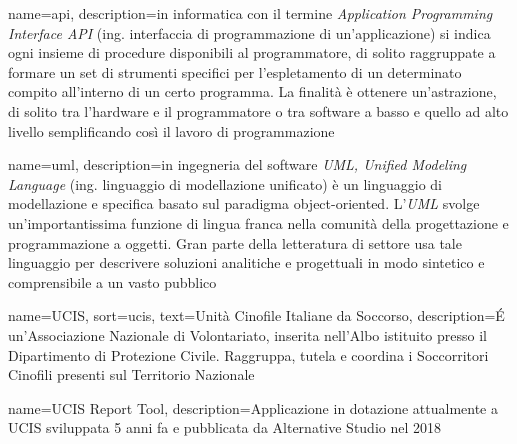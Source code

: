 \makeglossaries
\renewcommand{\acronymname}{Acronimi e abbreviazioni}

\renewcommand{\glossaryname}{Glossario}

{
    name=api,
    description={in informatica con il termine \emph{Application Programming Interface API} (ing. interfaccia di programmazione di un'applicazione) si indica ogni insieme di procedure disponibili al programmatore, di solito raggruppate a formare un set di strumenti specifici per l'espletamento di un determinato compito all'interno di un certo programma. La finalità è ottenere un'astrazione, di solito tra l'hardware e il programmatore o tra software a basso e quello ad alto livello semplificando così il lavoro di programmazione}
}

{
    name=uml,
    description={in ingegneria del software \emph{UML, Unified Modeling Language} (ing. linguaggio di modellazione unificato) è un linguaggio di modellazione e specifica basato sul paradigma object-oriented. L'\emph{UML} svolge un'importantissima funzione di lingua franca nella comunità della progettazione e programmazione a oggetti. Gran parte della letteratura di settore usa tale linguaggio per descrivere soluzioni analitiche e progettuali in modo sintetico e comprensibile a un vasto pubblico}
}

{
    name=UCIS,
    sort=ucis,
    text=Unità Cinofile Italiane da Soccorso,
    description={É un'Associazione Nazionale di Volontariato, inserita nell'Albo istituito presso il Dipartimento di Protezione Civile. Raggruppa, tutela e coordina i Soccorritori Cinofili presenti sul Territorio Nazionale}
}

{
  name=UCIS Report Tool,
  description={Applicazione in dotazione attualmente a UCIS sviluppata 5 anni fa e pubblicata da Alternative Studio nel 2018}
}

